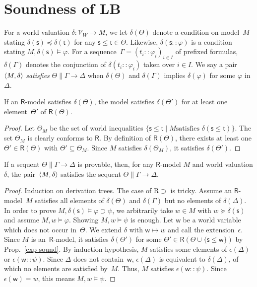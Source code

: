 \section{Soundness of LB}

For a world valuation $\delta:\mathcal V_W\longrightarrow M$,
we let $\delta(\Theta)$ denote a condition on
model~$M$ stating $\delta(\mathsf s)\preceq \delta(\mathsf t)$ for any
$\mathsf s\le \mathsf t\in\Theta$.
Likewise, $\delta(\mathsf s::\varphi)$ is a condition stating
$M,\delta(\mathsf s)\models\varphi$.  For a sequence~$\Gamma =
(t_i::\varphi_i)_{i\in I}$ of
prefixed formulas, $\delta(\Gamma)$ denotes the conjunction
of $\delta(t_i::\varphi_i)$ taken over $i\in I$.
   We say a pair
$\langle{M,\delta}\rangle$ \textit{satisfies}
$\Theta\parallel\Gamma\longrightarrow\Delta$ when $\delta(\Theta)$ and
$\delta(\Gamma)$ implies $\delta(\varphi)$ for some $\varphi$
in~$\Delta$.

\begin{proposition}
 \label{exp-sound}
 If an $\mathsf R$-model satisfies $\delta(\Theta)$,
 the model satisfies $\delta(\Theta')$ for 
 at least one element~$\Theta'$ of $\mathsf R(\Theta)$.
\end{proposition}
\begin{proof}
 Let $\Theta_M$ be the set of world inequalities
 $\{\mathsf s\le \mathsf t\mid M\mbox{
 satisfies }\delta(\mathsf s\le \mathsf t)\}$.
 The set $\Theta_M$ is clearly conforms to $\mathsf R$.
 By definition of $\mathsf R(\Theta)$, there exists at least one $\Theta'\in
 \mathsf R(\Theta)$ with $\Theta'\subseteq \Theta_M$.
 Since $M$ satisfies $\delta(\Theta_M)$, it satisfies $\delta(\Theta')$.
\end{proof}

\begin{lemma}
 \label{sound}
If a sequent $\Theta\parallel \Gamma\longrightarrow \Delta$ is
provable,
then, for any $\mathsf R$-model $M$ and world valuation $\delta$,
the pair~$\langle{M,\delta}\rangle$ satisfies the sequent $\Theta\parallel
 \Gamma\rightarrow\Delta$.
\end{lemma}
\begin{proof}
Induction on derivation trees.
 The case of R$\supset$ is tricky.
 Assume an $\mathsf R$-model~$M$ satisfies all elements of
 $\delta(\Theta)$ and $\delta(\Gamma)$ but no elements of $\delta(\Delta)$.
 In order to prove $M,\delta(\mathsf s)\models\varphi\supset\psi$, we
 arbitrarily take $w\in M$ with $ w\succeq \delta(\mathsf s)$ and assume $M,
  w\models\varphi$.
 Showing $M,w\models\psi$ is enough.
 Let $\mathsf w$ be a world variable which does not occur in~$\Theta$.
 We extend $\delta$ with $\mathsf{w}\mapsto w$ and call the extension~$\epsilon$.
 Since $M$ is an~$\mathsf R$-model,
 it satisfies $\delta(\Theta')$ for some $\Theta'\in \mathsf R(\Theta\cup
 \{\mathsf s\le \mathsf w\})$ by Prop.~\ref{exp-sound}.
 By induction hypothesis, $M$ satisfies some elements of $\epsilon(\Delta)$ or
 $\epsilon(\mathsf w::\psi)$. Since $\Delta$ does not contain~$\mathsf w$,
 $\epsilon(\Delta)$ is equivalent to $\delta(\Delta)$, of which no elements are
 satisfied by~$M$.
 Thus, $M$ satisfies $\epsilon(\mathsf w::\psi)$.
 Since $\epsilon(\mathsf w) = w$, this means $M,  w\models\psi$.
\end{proof}

